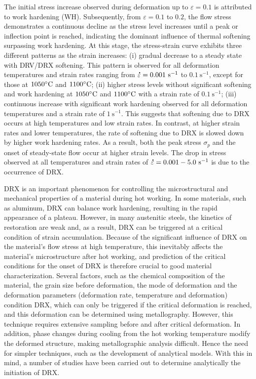 \documentclass[metals,article,submit,pdftex,moreauthors]{Definitions/mdpi}
\DeclareRobustCommand{\mdot}[1]{\accentset{\mbox{\bfseries .}}{#1}}
\DeclareRobustCommand{\ps}{\text{s}^{-1}}
\begin{document}
The initial stress increase observed during deformation up to $\varepsilon=0.1$ is attributed to work hardening (WH).
Subsequently, from $\varepsilon=0.1$ to $0.2$, the flow stress demonstrates a continuous decline as the stress level increases until a peak or inflection point is reached, indicating the dominant influence of thermal softening surpassing work hardening.
At this stage, the stress-strain curve exhibits three different patterns as the strain increases: (i) gradual decrease to a steady state with DRV/DRX softening.
This pattern is observed for all deformation temperatures and strain rates ranging from $\mdot\varepsilon=0.001~\ps$ to $0.1~\ps$, except for those at $1050\celsius$ and $1100\celsius$; (ii) higher stress levels without significant softening and work hardening at $1050\celsius$ and $1100\celsius$ with a strain rate of $0.1~\ps$; (iii) continuous increase with significant work hardening observed for all deformation temperatures and a strain rate of $1~\ps$.
This suggests that softening due to DRX  occurs at high temperatures and low strain rates.
In contrast, at higher strain rates and lower temperatures, the rate of softening due to DRX is slowed down by higher work hardening rates.
As a result, both the peak stress $\sigma_p$ and the onset of steady-state flow occur at higher strain levels.
The drop in stress observed at all temperatures and strain rates of $\mdot\varepsilon=0.001-5.0~\ps$ is due to the occurrence of DRX.

DRX is an important phenomenon for controlling the microstructural and mechanical properties of a material during hot working.
In some materials, such as aluminum, DRX can balance work hardening, resulting in the rapid appearance of a plateau.
However, in many austenitic steels, the kinetics of restoration are weak and, as a result, DRX can be triggered at a critical condition of strain accumulation.
Because of the significant influence of DRX on the material's flow stress at high temperature, this inevitably affects the material's microstructure after hot working, and prediction of the critical conditions for the onset of DRX is therefore crucial to good material characterization.
Several factors, such as the chemical composition of the material, the grain size before deformation, the mode of deformation and the deformation parameters (deformation rate, temperature and deformation) condition DRX, which can only be triggered if the critical deformation is reached, and this deformation can be determined using metallography.
However, this technique requires extensive sampling before and after critical deformation.
In addition, phase changes during cooling from the hot working temperature modify the deformed structure, making metallographic analysis difficult.
Hence the need for simpler techniques, such as the development of analytical models.
With this in mind, a number of studies have been carried out to determine analytically the initiation of DRX.
\end{document}
